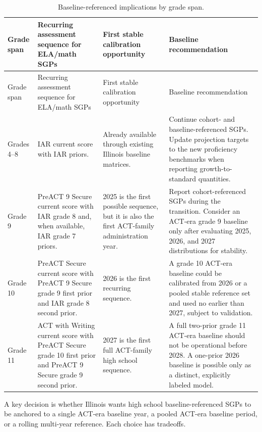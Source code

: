 \documentclass[11pt]{article}
\begin{document}
\begin{longtable}{L{0.18\textwidth}L{0.28\textwidth}L{0.18\textwidth}L{0.25\textwidth}}
\caption{Baseline-referenced implications by grade span.}\label{tab:baseline_map}\\
\toprule
Grade span & Recurring assessment sequence for ELA/math SGPs & First stable calibration opportunity & Baseline recommendation \\
\midrule
\endfirsthead
\toprule
Grade span & Recurring assessment sequence for ELA/math SGPs & First stable calibration opportunity & Baseline recommendation \\
\midrule
\endhead
Grades 4--8 & IAR current score with IAR priors. & Already available through existing Illinois baseline matrices. & Continue cohort- and baseline-referenced SGPs. Update projection targets to the new proficiency benchmarks when reporting growth-to-standard quantities. \\
\addlinespace
Grade 9 & PreACT 9 Secure current score with IAR grade 8 and, when available, IAR grade 7 priors. & 2025 is the first possible sequence, but it is also the first ACT-family administration year. & Report cohort-referenced SGPs during the transition. Consider an ACT-era grade 9 baseline only after evaluating 2025, 2026, and 2027 distributions for stability. \\
\addlinespace
Grade 10 & PreACT Secure current score with PreACT 9 Secure grade 9 first prior and IAR grade 8 second prior. & 2026 is the first recurring sequence. & A grade 10 ACT-era baseline could be calibrated from 2026 or a pooled stable reference set and used no earlier than 2027, subject to validation. \\
\addlinespace
Grade 11 & ACT with Writing current score with PreACT Secure grade 10 first prior and PreACT 9 Secure grade 9 second prior. & 2027 is the first full ACT-family high school sequence. & A full two-prior grade 11 ACT-era baseline should not be operational before 2028. A one-prior 2026 baseline is possible only as a distinct, explicitly labeled model. \\
\bottomrule
\end{longtable}

A key decision is whether Illinois wants high school baseline-referenced SGPs to be anchored to a single ACT-era baseline year, a pooled ACT-era baseline period, or a rolling multi-year reference. Each choice has tradeoffs.
\end{document}
